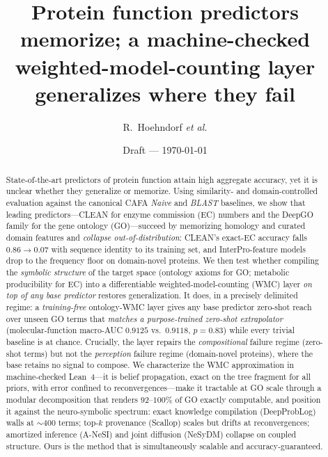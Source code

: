 \documentclass[11pt]{article}
\title{\bfseries Protein function predictors memorize; a machine-checked weighted-model-counting layer generalizes where they fail}
\author{R.\ Hoehndorf \textit{et al.}}
\date{Draft --- \today}
\begin{document}
\maketitle

\begin{abstract}
\noindent State-of-the-art predictors of protein function attain high aggregate accuracy, yet
it is unclear whether they generalize or memorize. Using similarity- and domain-controlled
evaluation against the canonical CAFA \emph{Naive} and \emph{BLAST} baselines, we show that
leading predictors---CLEAN for enzyme commission (EC) numbers and the DeepGO family for the gene
ontology (GO)---succeed by memorizing homology and curated domain features and \emph{collapse
out-of-distribution}: CLEAN's exact-EC accuracy falls $0.86\!\to\!0.07$ with sequence identity
to its training set, and InterPro-feature models drop to the frequency floor on domain-novel
proteins. We then test whether compiling the \emph{symbolic structure} of the target space
(ontology axioms for GO; metabolic producibility for EC) into a differentiable
weighted-model-counting (WMC) layer \emph{on top of any base predictor} restores generalization.
It does, in a precisely delimited regime: a \emph{training-free} ontology-WMC layer gives any
base predictor zero-shot reach over unseen GO terms that \emph{matches a purpose-trained
zero-shot extrapolator} (molecular-function macro-AUC $0.9125$ vs.\ $0.9118$, $p=0.83$) while
every trivial baseline is at chance. Crucially, the layer repairs the \emph{compositional}
failure regime (zero-shot terms) but not the \emph{perception} failure regime (domain-novel
proteins), where the base retains no signal to compose. We characterize the WMC approximation in
machine-checked Lean~4---it is belief propagation, exact on the tree fragment for all priors,
with error confined to reconvergences---make it tractable at GO scale through a modular
decomposition that renders $92$--$100\%$ of GO exactly computable, and position it against the
neuro-symbolic spectrum: exact knowledge compilation (DeepProbLog) walls at ${\sim}400$ terms;
top-$k$ provenance (Scallop) scales but drifts at reconvergences; amortized inference (A-NeSI)
and joint diffusion (NeSyDM) collapse on coupled structure. Ours is the method that is
simultaneously scalable and accuracy-guaranteed.
\end{abstract}
\end{document}
